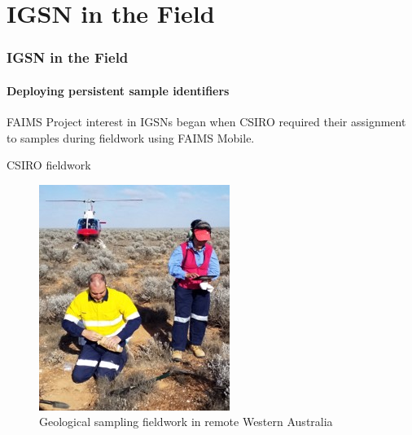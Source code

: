 \section{IGSN in the Field}

\begin{sectionframe} %
	\frametitle{IGSN in the Field}
	\framesubtitle{Deploying persistent sample identifiers}

    \vfill
    
FAIMS Project interest in IGSNs began when CSIRO required their assignment to samples during fieldwork using FAIMS Mobile.

\end{sectionframe}


\begin{frame}{CSIRO fieldwork}
 \begin{figure}[SF]
    \centering
    \vspace{-0.5cm}
        \includegraphics[height=.70\textheight]{figures/CSIRO-fieldwork.jpg}
        \caption{Geological sampling fieldwork in remote Western Australia}
        \label{fig:CSIRO geological sampling fieldwork}
 \end{figure}
\end{frame}




